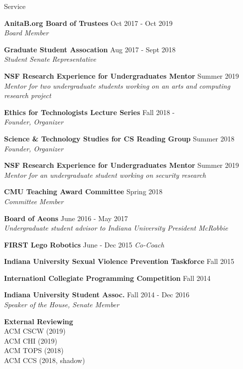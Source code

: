 \documentclass{resume} %
\begin{document}
\newpage
\begin{rSection}{Service}
	
	{\bf AnitaB.org Board of Trustees} \hfill Oct 2017 - Oct 2019\\ 
	\textit{Board Member} 

	{\bf Graduate Student Assocation} \hfill Aug 2017 - Sept 2018 \\ 
	\textit{Student Senate Representative} 


	{\bf NSF Research Experience for Undergraduates Mentor} \hfill Summer 2019 \\ 
	\textit{Mentor for two undergraduate students working on an arts and computing research project} 

	{\bf Ethics for Technologists Lecture Series} \hfill Fall 2018 - \\ 
	\textit{Founder, Organizer} 

	{\bf Science \& Technology Studies for CS Reading Group} \hfill Summer 2018 \\ 
	\textit{Founder, Organizer} 
	
	{\bf NSF Research Experience for Undergraduates Mentor} \hfill Summer 2019 \\ 
	\textit{Mentor for an undergraduate student working on security research} 
	
	{\bf CMU Teaching Award Committee} \hfill Spring 2018 \\ 
	\textit{Committee Member} 

	{\bf Board of Aeons} \hfill June 2016 - May 2017 \\
	\textit{Undergraduate student advisor to Indiana University President McRobbie}

	{\bf FIRST Lego Robotics} \hfill June - Dec 2015  
	\textit{Co-Coach}

	{\bf Indiana University Sexual Violence Prevention Taskforce} \hfill Fall 2015  

	{\bf Internationl Collegiate Programming Competition} \hfill Fall 2014 

	{\bf Indiana University Student Assoc.} \hfill Fall 2014 - Dec 2016 \\ 
	\textit{Speaker of the House, Senate Member} 


	{\bf External Reviewing} \\ 
	ACM CSCW (2019) \\
	ACM CHI (2019) \\
	ACM TOPS (2018) \\
	ACM CCS (2018, shadow) \\
\end{rSection}
\end{document}
